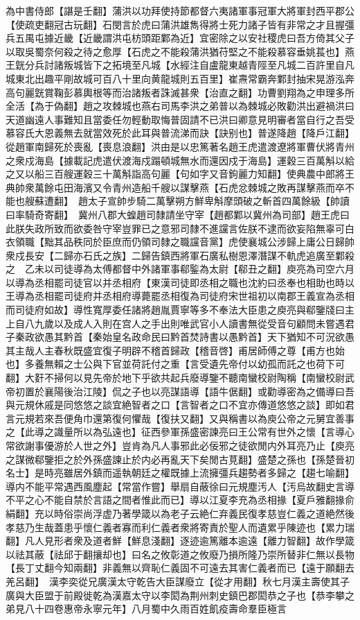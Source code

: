 為中書侍郎【諶是壬翻】蒲洪以功拜使持節都督六夷諸軍事冠軍大將軍封西平郡公【使疏吏翻冠古玩翻】石閔言於虎曰蒲洪雄雋得將士死力諸子皆有非常之才且握彊兵五禺屯據近畿【近畿謂洪屯枋頭距鄴為近】宜密除之以安社稷虎曰吾方倚其父子以取吳蜀奈何殺之待之愈厚【石虎之不能殺蒲洪猶苻堅之不能殺慕容垂姚萇也】燕王皝分兵討諸叛城皆下之拓境至凡城【水經注自盧龍東越青陘至凡城二百許里自凡城東北出趣平剛故城可百八十里向黄龍城則五百里】崔燾常霸奔鄴封抽宋晃游泓奔高句麗皝賞鞠彭慕輿根等而治諸叛者誅滅甚衆【治直之翻】功曹劉翔為之申理多所全活【為于偽翻】趙之攻棘城也燕右司馬李洪之弟普以為棘城必敗勸洪出避禍洪曰天道幽遠人事難知且當委任勿輕動取悔普固請不已洪曰卿意見明審者當自行之吾受慕容氏大恩義無去就當效死於此耳與普流涕而訣【訣别也】普遂降趙【降戶江翻】從趙軍南歸死於喪亂【喪息浪翻】洪由是以忠篤著名趙王虎遣渡遼將軍曹伏將青州之衆戍海島【據載記虎遣伏渡海戍蹋頓城無水而還因戍于海島】運穀三百萬斛以給之又以船三百艘運穀三十萬斛詣高句麗【句如字又音鉤麗力知翻】使典農中郎將王典帥衆萬餘屯田海濱又令青州造船千艘以謀擊燕【石虎忿棘城之敗再謀擊燕而卒不能也艘蘇遭翻】　趙太子宣帥步騎二萬擊朔方鮮卑斛摩頭破之斬首四萬餘級【帥讀曰率騎奇寄翻】　冀州八郡大蝗趙司隸請坐守宰【趙都鄴以冀州為司部】趙王虎曰此朕失政所致而欲委咎守宰豈罪已之意邪司隸不進讜言佐朕不逮而欲妄陷無辜可白衣領職【黜其品秩同於臣庶而仍領司隸之職讜音黨】虎使襄城公涉歸上庸公日歸帥衆戍長安【二歸亦石氏之族】二歸告鎮西將軍石廣私樹恩澤潛謀不軌虎追廣至鄴殺之　乙未以司徒導為太傅都督中外諸軍事郗鍳為太尉【郗丑之翻】庾亮為司空六月以導為丞相罷司徒官以并丞相府【東漢司徒即丞相之職也沈約曰丞奉也相助也時以王導為丞相罷司徒府并丞相府導薨罷丞相復為司徒府宋世祖初以南郡王義宣為丞相而司徒府如故】導性寬厚委任諸將趙胤賈寧等多不奉法大臣患之庾亮與郗鑒牋曰主上自八九歲以及成人入則在宫人之手出則唯武官小人讀書無從受音句顧問未嘗遇君子秦政欲愚其黔首【秦始皇名政命民曰黔首焚詩書以愚黔首】天下猶知不可況欲愚其主哉人主春秋既盛宜復子明辟不稽首歸政【稽音啓】甫居師傅之尊【甫方也始也】多養無賴之士公與下官並荷託付之重【言受遺先帝付以幼孤而託之也荷下可翻】大姧不掃何以見先帝於地下乎欲共起兵廢導鑒不聽南蠻校尉陶稱【南蠻校尉武帝初置於襄陽後治江陵】侃之子也以亮謀語導【語牛倨翻】或勸導密為之備導曰吾與元規休戚是同悠悠之談宜絶智者之口【言智者之口不宜亦傳道悠悠之談】即如君言元規若來吾便角巾還第復何懼哉【復扶又翻】又與稱書以為庾公帝之元舅宜善事之【此導之識量所以為弘遠也】征西參軍孫盛密諫亮曰王公常有世外之懷【言導心常欲謝事優游於人世之外】豈肯為凡人事邪此必佞邪之徒欲閒内外耳亮乃止【庾亮之謀微郗鑒拒之於外孫盛諫止於内必再亂天下矣閒古莧翻】盛楚之孫也【孫楚晉初名士】是時亮雖居外鎮而遥執朝廷之權既據上流擁彊兵趨勢者多歸之【趨七喻翻】導内不能平常遇西風塵起【常當作嘗】舉扇自蔽徐曰元規塵汚人【汚烏故翻史言導不平之心不能自禁於言語之間者惟此而已】導以江夏李充為丞相掾【夏戶雅翻掾俞絹翻】充以時俗崇尚浮虚乃著學箴以為老子云絶仁弃義民復孝慈豈仁義之道絶然後孝慈乃生哉蓋患乎懷仁義者寡而利仁義者衆將寄責於聖人而遺累乎陳迹也【累力瑞翻】凡人見形者衆及道者鮮【鮮息淺翻】逐迹逾篤離本逾遠【離力智翻】故作學箴以祛其蔽【祛邱于翻攘却也】曰名之攸彰道之攸廢乃損所隆乃崇所替非仁無以長物【長丁丈翻今知兩翻】非義無以齊恥仁義固不可遠去其害仁義者而已【遠于願翻去羌呂翻】　漢李奕從兄廣漢太守乾告大臣謀廢立【從才用翻】秋七月漢主壽使其子廣與大臣盟于前殿徙乾為漢嘉太守以李閎為荆州刺史鎮巴郡閎恭之子也【恭李攀之弟見八十四卷惠帝永寧元年】八月蜀中久雨百姓飢疫壽命羣臣極言